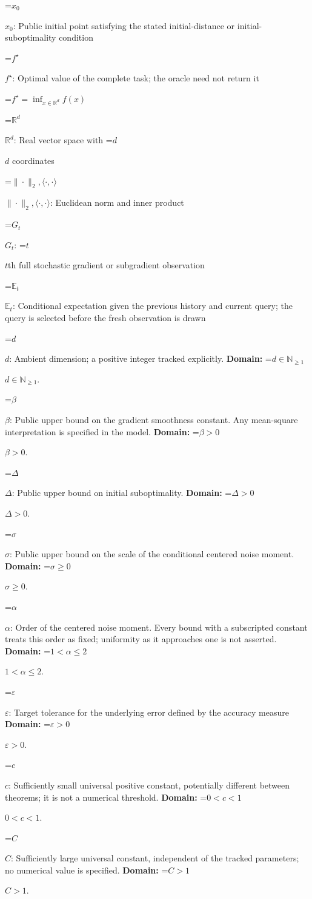 \documentclass[10pt,a4paper]{article}
\newcommand{\AtlasMath}[1]{\par\begingroup\centering\setbox0=\hbox{$\displaystyle #1$}\ifdim\wd0>1.4\linewidth\typeout{ATLAS WIDE FORMULA: \the\wd0}\fi\ifdim\wd0>\linewidth\resizebox{\linewidth}{!}{\box0}\else\box0\fi\par\endgroup}
\newcommand{\AtlasInlineMath}[1]{\begingroup\setbox0=\hbox{$#1$}\ifdim\wd0>.4\linewidth\endgroup\AtlasMath{#1}\else\endgroup$#1$\fi}
\begin{document}
\AtlasInlineMath{x_0}: Public initial point satisfying the stated initial-distance or initial-suboptimality condition

\AtlasInlineMath{f^\star}: Optimal value of the complete task; the oracle need not return it


\AtlasMath{f^\star=\inf_{x\in \mathbb{R}^d}f(x)}


\AtlasInlineMath{\mathbb{R}^d}: Real vector space with \AtlasInlineMath{d} coordinates

\AtlasInlineMath{\|\cdot\|_2,\langle\cdot,\cdot\rangle}: Euclidean norm and inner product

\AtlasInlineMath{G_t}: \AtlasInlineMath{t}th full stochastic gradient or subgradient observation

\AtlasInlineMath{\mathbb{E}_t}: Conditional expectation given the previous history and current query; the query is selected before the fresh observation is drawn

\AtlasInlineMath{d}: Ambient dimension; a positive integer tracked explicitly. \textbf{Domain:} \AtlasInlineMath{d\in\mathbb{N}_{\ge1}}.

\AtlasInlineMath{\beta}: Public upper bound on the gradient smoothness constant. Any mean-square interpretation is specified in the model. \textbf{Domain:} \AtlasInlineMath{\beta>0}.

\AtlasInlineMath{\Delta}: Public upper bound on initial suboptimality. \textbf{Domain:} \AtlasInlineMath{\Delta>0}.

\AtlasInlineMath{\sigma}: Public upper bound on the scale of the conditional centered noise moment. \textbf{Domain:} \AtlasInlineMath{\sigma\ge0}.

\AtlasInlineMath{\alpha}: Order of the centered noise moment. Every bound with a subscripted constant treats this order as fixed; uniformity as it approaches one is not asserted. \textbf{Domain:} \AtlasInlineMath{1<\alpha\le2}.

\AtlasInlineMath{\varepsilon}: Target tolerance for the underlying error defined by the accuracy measure \textbf{Domain:} \AtlasInlineMath{\varepsilon>0}.

\AtlasInlineMath{c}: Sufficiently small universal positive constant, potentially different between theorems; it is not a numerical threshold. \textbf{Domain:} \AtlasInlineMath{0<c<1}.

\AtlasInlineMath{C}: Sufficiently large universal constant, independent of the tracked parameters; no numerical value is specified. \textbf{Domain:} \AtlasInlineMath{C>1}.
\end{document}
